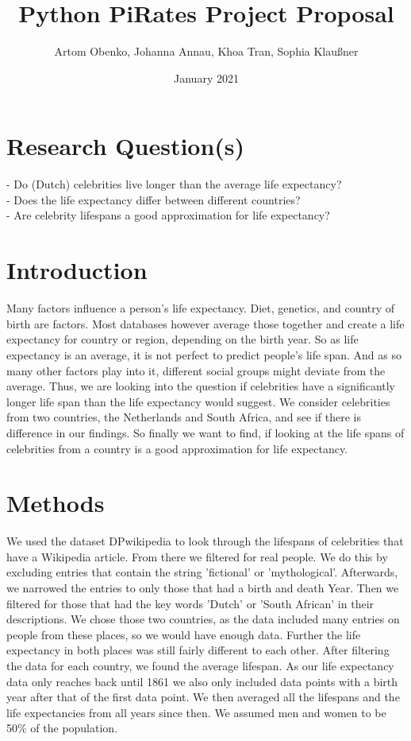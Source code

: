 \documentclass{article}
\title{Python PiRates Project Proposal}
\author{Artom Obenko, Johanna Annau, Khoa Tran, Sophia Klaußner }
\date{January 2021}
\begin{document}
	
\maketitle
	
\section{Research Question(s)}
	- Do (Dutch) celebrities live longer than the average life expectancy?\\
	- Does the life expectancy differ between different countries?\\
	- Are celebrity lifespans a good approximation for life expectancy?\\
	
\section{Introduction}
Many factors influence a person's life expectancy. Diet, genetics, and country of birth are factors. Most databases however average those together and create a life expectancy for country or region, depending on the birth year. %
So as life expectancy is an average, it is not perfect to predict people's life span. And as so many other factors play into it, different social groups might deviate from the average. Thus, we are looking into the question if celebrities have a significantly longer life span than the life expectancy would suggest. We consider celebrities from two countries, the Netherlands and South Africa, and see if there is difference in our findings. So finally we want to find, if looking at the life spans of celebrities from a country is a good approximation for life expectancy.

\section{Methods}
We used the dataset DPwikipedia to look through the lifespans of celebrities that have a Wikipedia article. From there we filtered for real people. We do this by excluding entries that contain the string 'fictional' or 'mythological'. Afterwards, we narrowed the entries to only those that had a birth and death Year. Then we filtered for those that had the key words 'Dutch' or 'South African' in their descriptions. We chose those two countries, as the data included many entries on people from these places, so we would have enough data. Further the life expectancy in both places was still fairly different to each other. After filtering the data for each country, we found the average lifespan. As our life expectancy data only reaches back until 1861 we also only included data points with a birth year after that of the first data point. We then averaged all the lifespans and the life expectancies from all years since then. We assumed men and women to be 50\% of the population.
 
\end{document}
